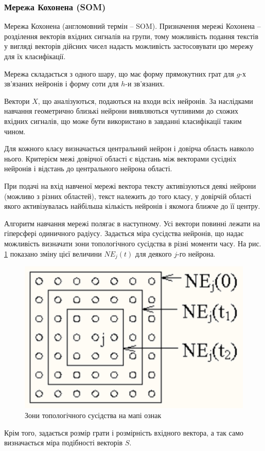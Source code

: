 \subsubsection{Мережа Кохонена (SOM)}
Мережа Кохонена (англомовний термін – SOM). Призначення мережі Кохонена – розділення векторів вхідних сигналів на групи, тому можливість подання текстів у вигляді векторів дійсних чисел надасть можливість застосовувати цю мережу для їх класифікації. 

Мережа складається з одного шару, що має форму прямокутних грат для $g$-х зв'язаних нейронів і форму соти для $h$-и зв'язаних. 

Вектори $X$, що аналізуються, подаються на входи всіх нейронів. За наслідками навчання геометрично близькі нейрони виявляються чутливими до схожих вхідних сигналів, що може бути використано в завданні класифікації таким чином.

Для кожного класу визначається центральний нейрон і довірча область навколо нього. Критерієм межі довірчої області є відстань між векторами сусідніх нейронів і відстань до центрального нейрона області. 

При подачі на вхід навченої мережі вектора тексту активізуються деякі нейрони (можливо з різних областей), текст належить до того класу, у довірчій області якого активізувалась найбільша кількість нейронів і якомога ближче до її центру. 

Алгоритм навчання мережі полягає в наступному. Усі вектори повинні лежати на гіперсфері одиничного радіусу. Задається міра сусідства нейронів, що надає можливість визначати зони топологічного сусідства в різні моменти часу. На рис. \ref{fig:learn_neura} показано зміну цієї величини $NE_{j}(t)$ для деякого $j$-го нейрона. 

\begin{figure}[h!]
  \centering
  \includegraphics[width=0.4\linewidth]{figures/learn_neura.png}
  \caption{Зони топологічного сусідства на мапі ознак}
  \label{fig:learn_neura}
\end{figure}

Крім того, задається розмір грати і розмірність вхідного вектора, а так само визначається міра подібності векторів $S$.

